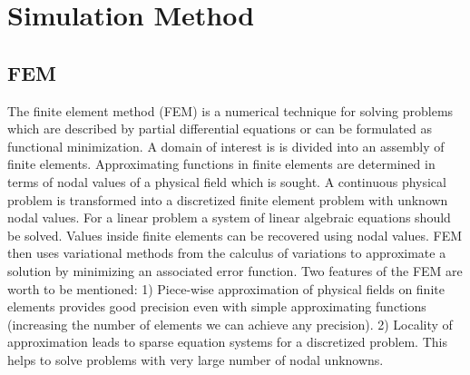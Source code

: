 %
% 
% 


\chapter{Simulation Method}
\label{sec:Simulation Method}

\section{FEM}
The finite element method (FEM) is a numerical technique for solving problems which are described by partial differential equations or can be formulated as functional minimization. A domain of interest is is divided into an assembly of finite elements. Approximating functions in finite elements are determined
in terms of nodal values of a physical field which is sought. A continuous physical problem is transformed into a discretized finite element problem with unknown nodal values. For a linear problem a system of linear algebraic equations should be solved. Values inside finite elements can be recovered
using nodal values. FEM then uses variational methods from the calculus of variations to approximate a solution by minimizing an associated error function.
Two features of the FEM are worth to be mentioned:
1) Piece-wise approximation of physical fields on finite elements provides good precision even with
simple approximating functions (increasing the number of elements we can achieve any precision).
2) Locality of approximation leads to sparse equation systems for a discretized problem. This helps to
solve problems with very large number of nodal unknowns.

